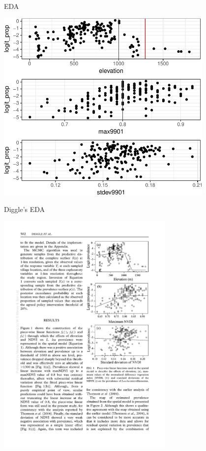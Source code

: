 \documentclass[11pt,ignorenonframetext,]{beamer}
\begin{document}
\begin{frame}{EDA}
\protect\hypertarget{eda}{}

\begin{center}\includegraphics[width=0.8\textwidth]{Lec20_files/figure-beamer/unnamed-chunk-5-1} \end{center}

\end{frame}

\begin{frame}{Diggle’s EDA}
\protect\hypertarget{diggles-eda}{}

\begin{center}
\includegraphics[width=0.65\textwidth]{figs/diggle_eda.pdf} \\
\end{center}

\end{frame}
\end{document}
